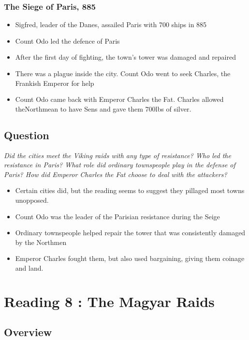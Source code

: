 \documentclass[12pt]{article}
\begin{document}
\subsubsection*{The Siege of Paris, 885}
\begin{itemize}
	\item Sigfred, leader of the Danes, assailed Paris with 700 ships in 885
	\item Count Odo led the defence of Paris
	\item After the first day of fighting, the town's tower was damaged and repaired
	\item There was a plague inside the city. Count Odo went to seek Charles, the Frankish Emperor for help
	\item Count Odo came back with Emperor Charles the Fat. Charles allowed theNorthmean to have Sens and gave them 700lbs of silver.
\end{itemize}
	
\subsection*{Question}

\begin{center}
	\textit{Did the cities meet the Viking raids with any type of resistance? Who led the resistance in Paris? What role did ordinary townspeople play in the defense of Paris? How did Emperor Charles the Fat choose to deal with the attackers?}
\end{center}

\begin{itemize}
	\item Certain cities did, but the reading seems to suggest they pillaged most towns unopposed. 
	\item Count Odo was the leader of the Parisian resistance during the Seige
	\item Ordinary townspeople helped repair the tower that was consistently damaged by the Northmen
	\item Emperor Charles fought them, but also used bargaining, giving them coinage and land.
\end{itemize}


\section*{Reading 8 : The Magyar Raids}

\subsection*{Overview}
\end{document}
